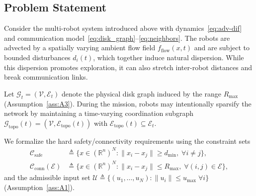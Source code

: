 \documentclass[conference]{IEEEconf}
\newcommand{\Ni}{\mathcal{N}}        %
\newcommand{\CN}[2]{\Ni(#1)\cap\Ni(#2)} %
\newcommand{\Nii}[1]{\Ni^{(2)}(#1)}  %
\theoremstyle{plain}
\begin{document}

\subsection{Problem Statement}
\label{subsec:problem_statement}

Consider the multi-robot system introduced above with dynamics~\eqref{eq:adv-dif} and communication model~\eqref{eq:disk_graph}--\eqref{eq:neighbors}. The robots are advected by a spatially varying ambient flow field $f_{\text{flow}}(x,t)$ and are subject to bounded disturbances $d_i(t)$, which together induce natural dispersion. While this dispersion promotes exploration, it can also stretch inter-robot distances and break communication links.

Let $\mathcal{G}_t=(\mathcal{V},\mathcal{E}_t)$ denote the physical disk graph induced by the range $R_{\max}$ (Assumption~\ref{ass:A3}). During the mission, robots may intentionally sparsify the network by maintaining a time-varying coordination subgraph $\mathcal{G}_{\mathrm{topo}}(t)=(\mathcal{V},\mathcal{E}_{\mathrm{topo}}(t))$ with $\mathcal{E}_{\mathrm{topo}}(t)\subseteq \mathcal{E}_t$.

We formalize the hard safety/connectivity requirements using the constraint sets
\begin{align*}
\mathcal{C}_{\mathrm{safe}} &\triangleq \Big\{x\in(\mathbb{R}^n)^N : \|x_i-x_j\|\ge d_{\min},\;\forall i\neq j\Big\},\\
\mathcal{C}_{\mathrm{conn}}(\mathcal{E}) &\triangleq \Big\{x\in(\mathbb{R}^n)^N : \|x_i-x_j\|\le R_{\max},\;\forall (i,j)\in\mathcal{E}\Big\},
\end{align*}
and the admissible input set $\mathcal{U}\triangleq\{(u_1,\dots,u_N):\|u_i\|\le u_{\max}\;\forall i\}$ (Assumption~\ref{ass:A1}).
\end{document}
